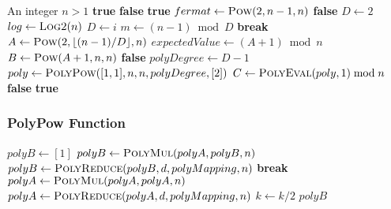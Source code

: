 \documentclass{article}
\theoremstyle{plain}
\theoremstyle{definition}
\begin{document}
\begin{algorithmic}
\Require An integer $n > 1$
            \State \Return \textbf{true} 
        \Else
            \State \Return \textbf{false} 
        \EndIf
    \EndIf
        \State \Return \textbf{true} 
    \EndIf
    \State $fermat \gets \Call{Pow}{2, n-1, n}$ 
        \State \Return \textbf{false} 
    \EndIf
    \State $D \gets 2$
    \State $log \gets \Call{Log2}{n}$
        \State $D \gets i$
        \State $m \gets (n-1) \bmod D$
            \State \textbf{break}
        \EndIf
    \EndFor
    \State $A \gets \Call{Pow}{2, \lfloor (n-1) / D \rfloor, n}$
    \State $expectedValue \gets (A + 1) \bmod n$
    \State $B \gets \Call{Pow}{A + 1, n, n}$
        \State \Return \textbf{false} 
    \EndIf
    \State $polyDegree \gets D - 1$ 
    \State $poly \gets \Call{PolyPow}{[1, 1], n, n, polyDegree, [2]}$
    \State $C \gets \Call{PolyEval}{poly, 1} \bmod n$ 
        \State \Return \textbf{false} 
    \EndIf
    \State \Return \textbf{true} 
\EndFunction
\end{algorithmic}

\subsubsection{PolyPow Function}
\begin{algorithmic}
    \State $polyB \gets [1]$ 
            \State $polyB \gets \Call{PolyMul}{polyA, polyB, n}$ 
            \State $polyB \gets \Call{PolyReduce}{polyB, d, polyMapping, n}$ 
                \State \textbf{break}
            \EndIf
        \EndIf
        \State $polyA \gets \Call{PolyMul}{polyA, polyA, n}$ 
        \State $polyA \gets \Call{PolyReduce}{polyA, d, polyMapping, n}$ 
        \State $k \gets k / 2$
    \EndWhile
    \State \Return $polyB$
\EndFunction
\end{algorithmic}
\end{document}
